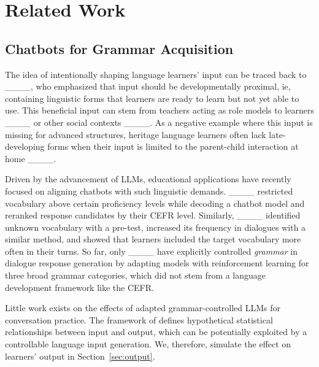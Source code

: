 \section{Related Work}
\label{sec:related_works}


\subsection{Chatbots for Grammar Acquisition}
The idea of intentionally shaping language learners' input can be traced back to
____, who emphasized that input should be developmentally proximal, ie, containing linguistic forms that learners are ready to learn but not yet able to use.
This beneficial input can stem from teachers acting as role models to learners ____ or other social contexts ____. As a negative example where this input is missing for advanced structures, heritage language learners often lack late-developing forms when their input is limited to the parent-child interaction at home ____.

Driven by the advancement of LLMs, educational applications have recently focused on aligning chatbots with such linguistic demands. ____ restricted vocabulary above certain proficiency levels while decoding a chatbot model and reranked response candidates by their CEFR level. %
Similarly, ____ identified unknown vocabulary with a pre-test, increased its frequency in dialogues with a similar method, and showed that learners included the target vocabulary more often in their turns.  %
So far, only ____ have explicitly controlled \textit{grammar} in dialogue response generation by adapting models with reinforcement learning for three broad grammar categories, which did not stem from a language development framework like the CEFR.

Little work exists on the effects of adapted grammar-controlled LLMs for conversation practice. The framework of  defines hypothetical statistical relationships between input and output, which can be potentially exploited by a controllable language input generation. We, therefore, simulate the effect on learners' output in Section~\ref{sec:output}.

